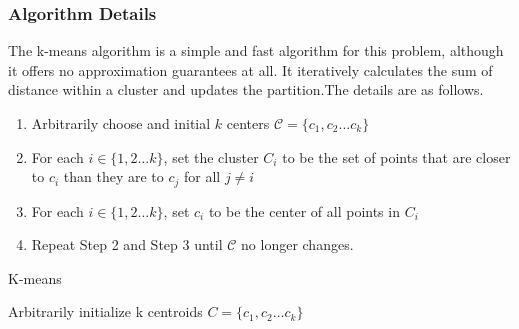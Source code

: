 \documentclass[11pt]{article}
\begin{document}
\subsubsection{Algorithm Details}
The k-means algorithm is a simple and fast algorithm for this problem, although it offers no approximation guarantees at all.
It iteratively calculates the sum of distance within a cluster and updates the partition.The details are as follows.\cite{k-means}
\begin{enumerate}
  \item Arbitrarily choose and initial $k$ centers $\mathcal{C} = \{c_1, c_2 \dots c_k\}$
  \item For each $i \in \{1, 2 \dots k\}$, set the cluster $C_i$ to be the set of points that are closer to $c_i$ than they are to $c_j$ for all $j \neq i$
  \item For each $i \in \{1, 2 \dots k\}$, set $c_i$ to be the center of all points in $C_i$ 
  \item Repeat Step 2 and Step 3 until $\mathcal{C}$ no longer changes.
\end{enumerate}
\begin{algorithm}
  \caption{K-means}
  \label{k-means}
  \begin{algorithmic}
    \STATE Arbitrarily initialize k centroids $C=\{c_1, c_2 \dots c_k\}$ 
    \REPEAT
      \ENDFOR
      \ENDFOR
      \ENDFOR
      \ENDFOR
  \end{algorithmic}
\end{algorithm}
\end{document}
